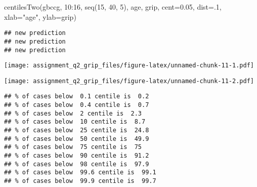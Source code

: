 \documentclass[
]{article}
\newenvironment{Shaded}{\begin{snugshade}}{\end{snugshade}}
\newcommand{\AttributeTok}[1]{\textcolor[rgb]{0.77,0.63,0.00}{#1}}
\newcommand{\DecValTok}[1]{\textcolor[rgb]{0.00,0.00,0.81}{#1}}
\newcommand{\FloatTok}[1]{\textcolor[rgb]{0.00,0.00,0.81}{#1}}
\newcommand{\FunctionTok}[1]{\textcolor[rgb]{0.00,0.00,0.00}{#1}}
\newcommand{\NormalTok}[1]{#1}
\newcommand{\SpecialCharTok}[1]{\textcolor[rgb]{0.00,0.00,0.00}{#1}}
\newcommand{\StringTok}[1]{\textcolor[rgb]{0.31,0.60,0.02}{#1}}
\begin{document}
\begin{Shaded}
\begin{Highlighting}[]
\FunctionTok{centilesTwo}\NormalTok{(gbccg, }\DecValTok{10}\SpecialCharTok{:}\DecValTok{16}\NormalTok{, }\FunctionTok{seq}\NormalTok{(}\DecValTok{15}\NormalTok{, }\DecValTok{40}\NormalTok{, }\DecValTok{5}\NormalTok{), age,  grip, }\AttributeTok{cent=}\FloatTok{0.05}\NormalTok{, }\AttributeTok{dist=}\NormalTok{.}\DecValTok{1}\NormalTok{, }\AttributeTok{xlab=}\StringTok{"age"}\NormalTok{, }\AttributeTok{ylab=}\StringTok{\textquotesingle{}grip\textquotesingle{}}\NormalTok{)}
\end{Highlighting}
\end{Shaded}

\begin{verbatim}
## new prediction 
## new prediction 
## new prediction
\end{verbatim}

\texttt{[image: assignment\_q2\_grip\_files/figure-latex/unnamed-chunk-11-1.pdf]}

\begin{Shaded}
\end{Shaded}

\texttt{[image: assignment\_q2\_grip\_files/figure-latex/unnamed-chunk-11-2.pdf]}

\begin{verbatim}
## % of cases below  0.1 centile is  0.2 
## % of cases below  0.4 centile is  0.7 
## % of cases below  2 centile is  2.3 
## % of cases below  10 centile is  8.7 
## % of cases below  25 centile is  24.8 
## % of cases below  50 centile is  49.9 
## % of cases below  75 centile is  75 
## % of cases below  90 centile is  91.2 
## % of cases below  98 centile is  97.9 
## % of cases below  99.6 centile is  99.1 
## % of cases below  99.9 centile is  99.7
\end{verbatim}
\end{document}
